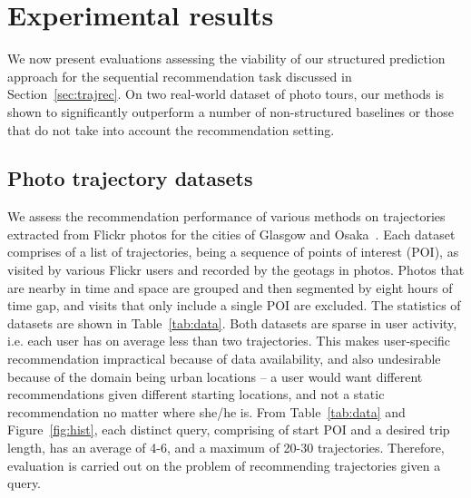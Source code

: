 
\secmoveup
\section{Experimental results}
\label{sec:experiment}
\textmoveup

We now present evaluations assessing the viability of our structured prediction approach
for the sequential recommendation task discussed in Section~\ref{sec:trajrec}.
On two real-world dataset of photo tours, our methods is shown to significantly outperform
a number of non-structured baselines or those that do not take into account the recommendation setting.


\secmoveup
\subsection{Photo trajectory datasets}
\label{sec:dataset}
\textmoveup

We assess the recommendation performance %
of various methods
on trajectories extracted from Flickr photos
for the cities of Glasgow and Osaka~\cite{thomee2016yfcc100m,ijcai15}.
Each dataset comprises of a
list of trajectories, being a sequence of points of interest (POI), as visited by various Flickr users
and recorded by the geotags in photos. Photos that are nearby in time and space are grouped and then segmented by eight hours of time gap, and visits that only include a single POI are excluded.
The statistics of datasets are shown in Table~\ref{tab:data}.
Both datasets are sparse in user activity,
i.e. each user has on average less than two trajectories.
This makes user-specific recommendation impractical because of
data availability, and also undesirable because of the domain being urban locations
-- a user would want different recommendations given different starting locations, and not a static recommendation no matter where she/he is.
From Table~\ref{tab:data} and Figure~\ref{fig:hist},
each distinct query, comprising of start POI and a desired trip length,
has an average of 4-6, and a maximum of 20-30 trajectories.
Therefore, evaluation is carried out on the problem of recommending trajectories given a query.


